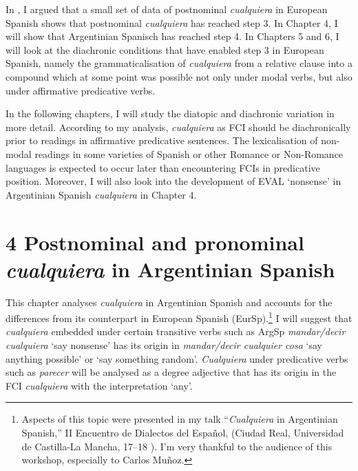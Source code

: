\documentclass[output=paper]{langscibook}
\begin{document}
In , I argued that a small set of data of postnominal \textit{cualquiera} in European Spanish shows that postnominal \textit{cualquiera} has reached step 3. In Chapter 4, I will show that Argentinian Spanisch has reached step 4. In Chapters 5 and 6, I will look at the diachronic conditions that have enabled step 3 in European Spanish, namely the grammaticalisation of \textit{cualquiera} from a relative clause into a compound which at some point was possible not only under modal verbs, but also under affirmative predicative verbs.

  In the following chapters, I will study the diatopic and diachronic variation in more detail. According to my analysis, \textit{cualquiera} as FCI should be diachronically prior to readings in affirmative predicative sentences. The lexicalisation of non-modal readings in some varieties of Spanish or other Romance or Non-Romance languages is expected to occur later than encountering FCIs in predicative position. Moreover, I will also look into the development of EVAL ‘nonsense’ in Argentinian Spanish \textit{cualquiera} in Chapter 4.

\section{\textbf{4} \textbf{Postnominal} \textbf{and} \textbf{pronominal} \textbf{\textit{cualquiera} }\textbf{in} \textbf{Argentinian} \textbf{Spanish}}

This chapter analyses \textit{cualquiera} in Argentinian Spanish and accounts for the differences from its counterpart in European Spanish (EurSp).\footnote{ \textrm{Aspects of this topic were presented in my talk “}\textrm{\textit{Cualquiera}} \textrm{in Argentinian Spanish,” II Encuentro de Dialectos del Español, (Ciudad Real, Universidad de Castilla-La Mancha, 17–18 \citealt{May2018}). I’m very thankful to the audience of this workshop, especially to Carlos Muñoz.}} I will suggest that \textit{cualquiera} embedded under certain transitive verbs such as ArgSp \textit{mandar/decir cualquiera} ‘say nonsense’ has its origin in \textit{mandar/decir cualquier cosa} ‘say anything possible’ or ‘say something random’. \textit{Cualquiera} under predicative verbs such as \textit{parecer} will be analysed as a degree adjective that has its origin in the FCI \textit{cualquiera} with the interpretation ‘any’.
\end{document}
